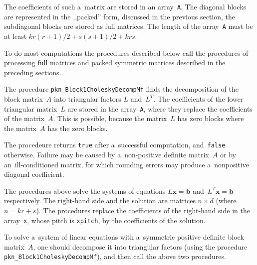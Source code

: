 The coefficients of such a~matrix are stored in an array~\texttt{A}.
The diagonal blocks are represented in the ,,packed'' form, discussed in the
previous section, the subdiagonal blocks are stored as full matrices.
The length of the array~\texttt{A} must be at least
$kr(r+1)/2+s(s+1)/2+krs$.

To do most computations the procedures described below call the procedures
of processing full matrices and packed symmetric matrices described
in the preceding sections.

\vspace{\bigskipamount}
The procedure \texttt{pkn\_Block1CholeskyDecompMf} finds the decomposition
of the block matrix~$A$ into triangular factors $L$ and~$L^T$.
The coefficients of the lower triangular matrix~$L$ are stored in the
array~\texttt{A}, where they replace
the coefficients of the matrix~$A$. This is possible, because
the matrix~$L$ has zero blocks where the matrix~$A$ has the zero blocks.

The procedeure returns \texttt{true} after a~successful computation,
and~\texttt{false} otherwise. Failure may be caused by a~non-positive
definite matrix~$A$ or by an~ill-conditioned matrix, for which
rounding errors may produce a~nonpositive diagonal coefficient.

\vspace{\bigskipamount}
The procedures above solve the systems of equations $L\bm{x}=\bm{b}$
and~$L^T\bm{x}=\bm{b}$ respectively. The right-hand side and the solution
are matrices $n\times d$ (where $n=kr+s$). The procedures replace the
coefficients of the right-hand side in the array~\texttt{x}, whose pitch
is \texttt{xpitch}, by the coefficients of the solution.

To solve a~system of linear equations with a~symmetric positive definite
block matrix~$A$, one should decompose it into triangular factors
(using the procedure \texttt{pkn\_Block1CholeskyDecompMf}), and then call
the above two procedures.

